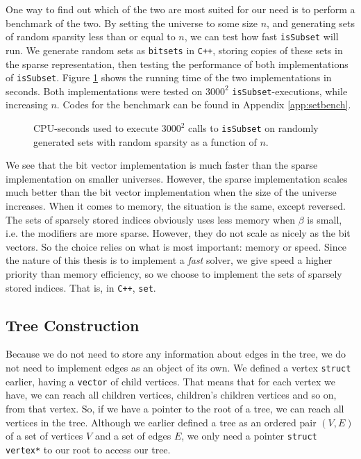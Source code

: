 One way to find out which of the two are most suited for our need is to perform
a benchmark of the two.
By setting the universe to some size $n$, and generating sets of
random sparsity less than or equal to $n$, we can test how fast
\texttt{isSubset} will run.
We generate random sets as \texttt{bitsets} in \texttt{C++}, storing copies
of these sets in the sparse representation, then testing the performance 
of both implementations of \texttt{isSubset}.
Figure \ref{fig:setspeed}
shows the running time of the two implementations in seconds. Both
implementations were tested on $3000^2$ \texttt{isSubset}-executions, while
increasing $n$.
Codes for the benchmark can be found in Appendix \ref{app:setbench}.
\begin{figure}[ht!]
\centering

\caption{CPU-seconds used to execute $3000^2$ calls to \texttt{isSubset} on
         randomly generated sets with random sparsity as a function of $n$.}
\label{fig:setspeed}
\end{figure}

We see that the bit vector implementation is much faster than the sparse
implementation on smaller universes. However, the sparse implementation
scales much better than the bit vector implementation when the size of
the universe increases. When it comes to memory, the situation is the same,
except reversed. The sets of sparsely stored indices obviously uses less
memory when $\beta$ is small, i.e. the modifiers are more sparse. However, they
do not scale as nicely as the bit vectors. So the choice relies on what is
most important: memory or speed. Since the nature of this thesis is to
implement a \emph{fast} solver, we give speed a higher priority than memory 
efficiency, so we choose to implement the sets of sparsely stored
indices. That is, in \texttt{C++}, \texttt{set}.

\subsection{Tree Construction}
Because we do not need to store any information about edges in the tree,
we do not need to implement edges as an object of its own. We defined
a vertex \texttt{struct} earlier, having a \texttt{vector} of child
vertices. That means that for each vertex we have, we can reach all children
vertices, children's children vertices and so on, from that vertex.
So, if we have a pointer to the root of a tree, we can reach all vertices
in the tree. Although we earlier defined a tree as an ordered pair
$(V, E)$ of a set of vertices $V$ and a set of edges $E$, we only need a
pointer \texttt{struct vertex*} to our root to access our tree.

